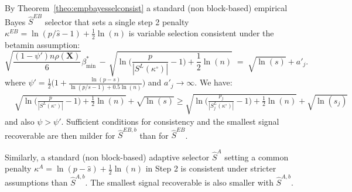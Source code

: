 \documentclass[aos]{imsart}
\theoremstyle{plain}
\newcommand{\bs}{\boldsymbol}
\begin{document}
By Theorem~\ref{theo:empbayesselconsist} a standard (non block-based) empirical Bayes $\hat S^{EB}$ selector that sets a single step 2 penalty $\kappa^{EB}=\ln(p/\widehat{s} -1)+ \tfrac{1}{2}\ln(n)$ is variable selection consistent under the betamin assumption:
\begin{equation}\label{eq:betaminEB}
        \sqrt{\frac{ (1-\psi')n\rho(\bs X)}{6}}{\beta_{\min}^*} \,- \,\sqrt{\ln\bigg(\frac{p}{|S^{L}(\kappa^{\circ})|}-1\bigg)+\frac12\ln(n)} \;=\; \sqrt{\ln(s)} + a'_j .
    \end{equation}
where $\psi'=\frac12\big(1+ \frac{\ln(p-s)}{\ln(p/s-1)+0.5\ln(n)}\big)$ and $a'_j \to \infty$. We have:
\begin{eqnarray*}
&\sqrt{\ln\bigg(\frac{p}{|S^{L}(\kappa^{\circ})|}-1\bigg)+\frac12\ln(n)} + \sqrt{\ln(s)} \geq \sqrt{\ln\bigg(\frac{p_j}{|S^{L}_j(\kappa^{\circ})|}-1\bigg)+\frac12\ln(n)} + \sqrt{\ln(s_j)}
\end{eqnarray*}
and also $\psi > \psi'$. Sufficient conditions for consistency and the smallest signal recoverable are then milder for $\hat S^{EB,b}$ than for $\hat S^{EB}$. %

Similarly, a standard (non block-based) adaptive selector $\hat S^{A}$ setting a common penalty $\kappa^{A}=\ln(p-\widehat{s})+ \tfrac{1}{2}\ln(n)$ in Step 2 is consistent under stricter assumptions than $\hat S^{A,b}$. The smallest signal recoverable is also smaller with $\hat S^{A,b}$. %


\end{document}
